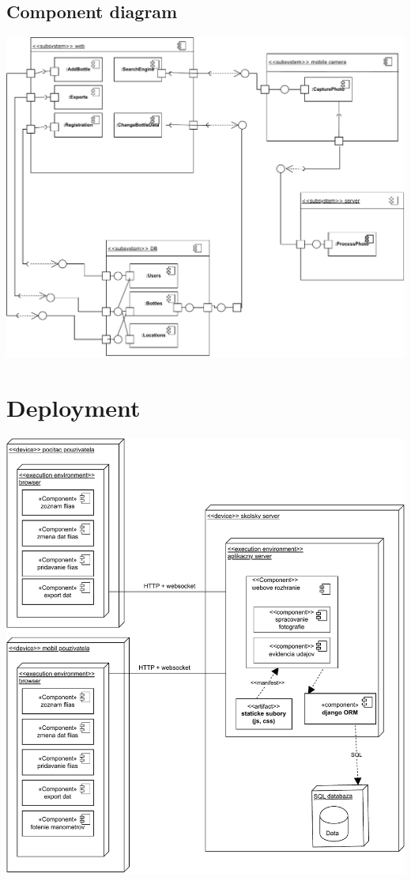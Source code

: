\documentclass{zah}
\begin{document}
\subsection{Component diagram}
\includegraphics[width=\textwidth]{navrh-assets/component}

\section{Deployment}
\includegraphics[width=\textwidth]{navrh-assets/deployment}
\end{document}
